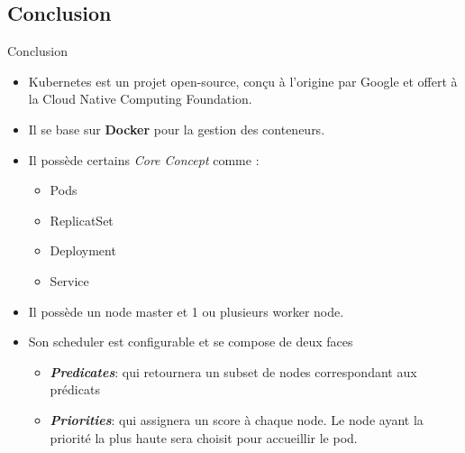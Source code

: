 \documentclass{bredelebeamer}
\begin{document}
\subsection{Conclusion}
\begin{frame}{Conclusion}
\begin{itemize}
\item Kubernetes est un projet open-source, conçu à l'origine par Google et offert à la Cloud Native Computing Foundation.
\item Il se base sur \textbf{Docker} pour la gestion des conteneurs.
\item Il possède certains \textit{Core Concept} comme : 
\begin{itemize}
\item Pods
\item ReplicatSet
\item Deployment
\item Service
\end{itemize}
\item Il possède un node master et 1 ou plusieurs worker node.
\item Son scheduler est configurable et se compose de deux faces 
\begin{itemize}
\item \textbf{\textit{Predicates}}: qui retournera un subset de nodes correspondant aux prédicats
\item \textbf{\textit{Priorities}}: qui assignera un score à chaque node. Le node ayant la priorité la plus haute sera choisit pour accueillir le pod.
\end{itemize}
\end{itemize}
\end{frame}
\end{document}
